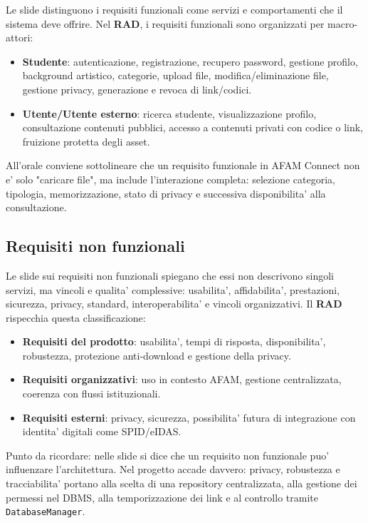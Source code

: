 ﻿\documentclass[11pt,a4paper]{article}
\newcommand{\doc}[1]{\textbf{#1}}
\newcommand{\term}[1]{\textbf{#1}}
\begin{document}
Le slide distinguono i requisiti funzionali come servizi e comportamenti che il sistema
deve offrire. Nel \doc{RAD}, i requisiti funzionali sono organizzati per macro-attori:
\begin{itemize}
  \item \term{Studente}: autenticazione, registrazione, recupero password, gestione
  profilo, background artistico, categorie, upload file, modifica/eliminazione file,
  gestione privacy, generazione e revoca di link/codici.
  \item \term{Utente/Utente esterno}: ricerca studente, visualizzazione profilo,
  consultazione contenuti pubblici, accesso a contenuti privati con codice o link,
  fruizione protetta degli asset.
\end{itemize}

All'orale conviene sottolineare che un requisito funzionale in AFAM Connect non e' solo
"caricare file", ma include l'interazione completa: selezione categoria, tipologia,
memorizzazione, stato di privacy e successiva disponibilita' alla consultazione.

\subsection{Requisiti non funzionali}

Le slide sui requisiti non funzionali spiegano che essi non descrivono singoli servizi,
ma vincoli e qualita' complessive: usabilita', affidabilita', prestazioni, sicurezza,
privacy, standard, interoperabilita' e vincoli organizzativi. Il \doc{RAD} rispecchia questa
classificazione:
\begin{itemize}
  \item \term{Requisiti del prodotto}: usabilita', tempi di risposta, disponibilita',
  robustezza, protezione anti-download e gestione della privacy.
  \item \term{Requisiti organizzativi}: uso in contesto AFAM, gestione centralizzata,
  coerenza con flussi istituzionali.
  \item \term{Requisiti esterni}: privacy, sicurezza, possibilita' futura di integrazione
  con identita' digitali come SPID/eIDAS.
\end{itemize}

Punto da ricordare: nelle slide si dice che un requisito non funzionale puo' influenzare
l'architettura. Nel progetto accade davvero: privacy, robustezza e tracciabilita' portano
alla scelta di una repository centralizzata, alla gestione dei permessi nel DBMS, alla
temporizzazione dei link e al controllo tramite \texttt{DatabaseManager}.
\end{document}
